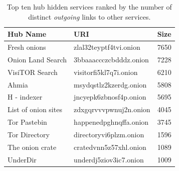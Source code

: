   \begin{table}[t]
      \begin{center}
          \caption{Top ten hub hidden services ranked by the number of distinct \emph{outgoing} links to other services.}
          \label{table:toptenout}
          \begin{tabular}{p{3cm} | p{3.5cm} | p{1cm}}
               \textbf{Hub Name} & \textbf{URI} & \textbf{Size} \\
               \hline
               \hline
              Fresh onions & zlal32teyptf4tvi.onion  &  7650\\
              \hline
              Onion Land Search & 3bbaaaccczcbdddz.onion  &  7228\\
              \hline
              VisiTOR Search & visitorfi5kl7q7i.onion  &  6210\\
              \hline
              Ahmia & msydqstlz2kzerdg.onion  &  5808\\
              \hline
              H - indexer & jncyepk6zbnosf4p.onion  &  5695\\
              \hline
              List of onion sites & zdxgqrvvvpwnuj2n.onion  &  4045\\
              \hline
              Tor Pastebin & happenedpghnqffa.onion  &  3745\\
              \hline
              Tor Directory & directoryvi6plzm.onion  &  1596\\
              \hline
              The onion crate & cratedvnn5z57xhl.onion  &  1089\\
              \hline
              UnderDir & underdj5ziov3ic7.onion  &  1009\\
          \end{tabular}
      \end{center}
  \end{table}
\fi

